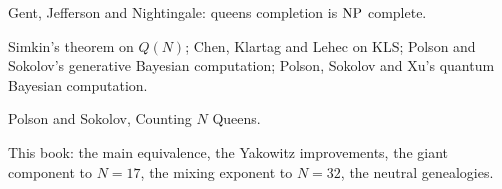 \begin{description}[style=nextline]
\item[2017] Gent, Jefferson and Nightingale: queens completion is $\mathrm{NP}$ complete.
\item[2021 to 2023] Simkin's theorem on $Q(N)$; Chen, Klartag and Lehec on KLS; Polson and Sokolov's generative Bayesian computation; Polson, Sokolov and Xu's quantum Bayesian computation.
\item[2024] Polson and Sokolov, Counting $N$ Queens.
\item[2026] This book: the main equivalence, the Yakowitz improvements, the giant component to $N = 17$, the mixing exponent to $N = 32$, the neutral genealogies.
\end{description}
